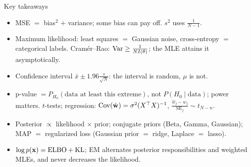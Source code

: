 \documentclass[aspectratio=1610,11pt]{beamer}
\begin{document}
\begin{frame}{Key takeaways}
    \small
    \begin{itemize}
        \item MSE $=$ bias$^2$ $+$ variance; some bias can pay off. $s^2$ uses $\frac{1}{N - 1}$.
        \item Maximum likelihood: least squares $=$ Gaussian noise, cross-entropy $=$ categorical labels. Cram\'er--Rao: $\operatorname{Var} \geq \frac{1}{NI(\theta)}$; the MLE attains it asymptotically.
        \item Confidence interval $\bar x \pm 1.96\frac{s}{\sqrt N}$: the interval is random, $\mu$ is not.
        \item p-value $= P_{H_0}(\text{data at least this extreme})$, not $P(H_0 \mid \text{data})$; power matters. $t$-tests; regression: $\operatorname{Cov}(\hat{\mathbf{w}}) = \sigma^2(X^\top X)^{-1}$, $\frac{\hat w_j - w_j}{\mathrm{SE}_j} \sim t_{N-n}$.
        \item Posterior $\propto$ likelihood $\times$ prior; conjugate priors (Beta, Gamma, Gaussian); MAP $=$ regularized loss (Gaussian prior $=$ ridge, Laplace $=$ lasso).
        \item $\log p(\mathbf{x}) = \mathrm{ELBO} + \operatorname{KL}$; EM alternates posterior responsibilities and weighted MLEs, and never decreases the likelihood.
    \end{itemize}
\end{frame}

\end{document}
